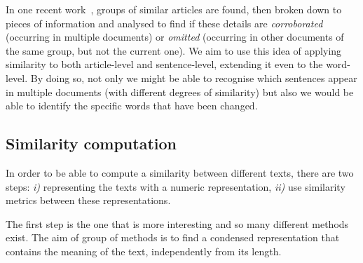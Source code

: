 


In one recent work~\cite{bountouridis2018explaining}, groups of similar articles are found, then broken down to pieces of information and analysed to find if these details are \emph{corroborated} (occurring in multiple documents) or \emph{omitted} (occurring in other documents of the same group, but not the current one). 
We aim to use this idea of applying similarity to both article-level and sentence-level, extending it even to the word-level. By doing so,
not only we might be able to recognise which sentences appear in multiple documents (with different degrees of similarity) but also we would be able to identify the specific words that have been changed.





\subsection{Similarity computation}
In order to be able to compute a similarity between different texts, there are two steps: \emph{i)} representing the texts with a numeric representation, \textit{ii)} use similarity metrics between these representations.

The first step is the one that is more interesting and so many different methods exist.
The aim of group of methods is to find a condensed representation that contains the meaning of the text, independently from its length.

